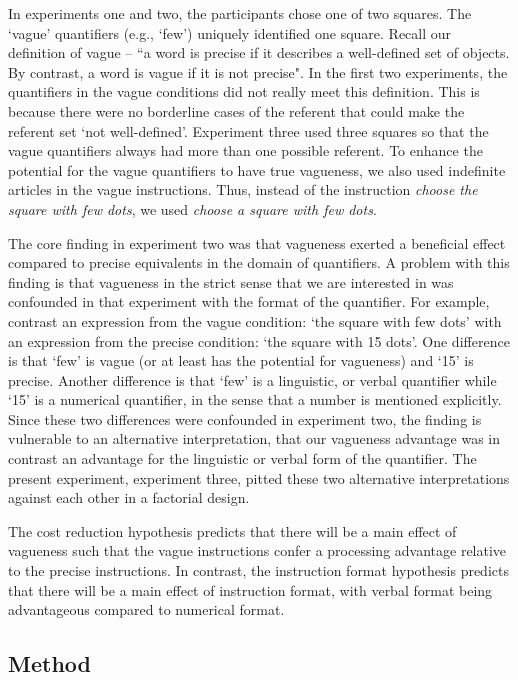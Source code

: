 \documentclass[man,floatmark]{apa}
\begin{document}
In experiments one and two, the participants chose one of two squares. The `vague' quantifiers (e.g., `few') uniquely identified one square. Recall our definition of vague  -- ``a word is precise if it describes a well-defined set of objects. By contrast, a word is vague if it is not precise".  In the first two experiments, the quantifiers in the vague conditions did not really meet this definition. This is because there were no borderline cases of the referent that could make the referent set `not well-defined'. Experiment three used three squares so that the vague quantifiers always had more than one possible referent. To enhance the potential for the vague quantifiers to have true vagueness, we also used indefinite articles in the vague instructions. Thus, instead of the instruction \emph{choose the square with few dots}, we used \emph{choose a square with few dots}.

The core finding in experiment two was that vagueness exerted a beneficial effect compared to precise equivalents in the domain of quantifiers. A problem with this finding is that vagueness in the strict sense that we are interested in was confounded in that experiment with the format of the quantifier. For example, contrast an expression from the vague condition: `the square with few dots' with an expression from the precise condition: `the square with 15 dots'. One difference is that `few' is vague (or at least has the potential for vagueness) and `15' is precise. Another difference is that `few' is a linguistic, or verbal quantifier while `15' is a numerical quantifier, in the sense that a number is mentioned explicitly. Since these two differences were confounded in experiment two, the finding is vulnerable to an alternative interpretation, that our vagueness advantage was in contrast an advantage for the linguistic or verbal form of the quantifier. The present experiment, experiment three, pitted these two alternative interpretations against each other in a factorial design.

The cost reduction hypothesis predicts that there will be a main effect of vagueness such that the vague instructions confer a processing advantage relative to the precise instructions.  In contrast, the instruction format hypothesis predicts that there will be a main effect of instruction format, with verbal format being advantageous compared to numerical format.

\subsection{Method}
\end{document}
